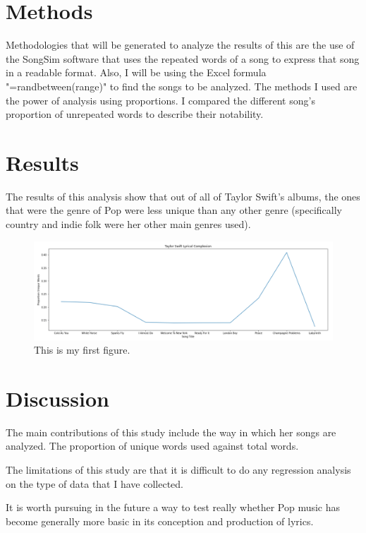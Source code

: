 \documentclass[12pt]{article}
\begin{document}
\section{Methods}
\label{sec:meth}

Methodologies that will be generated to analyze the results of this are the use of the SongSim software that uses the repeated words of a song to express that song in a readable format. Also, I will be using the Excel formula "=randbetween(range)" to find the songs to be analyzed. The methods I used are the power of analysis using proportions. I compared the different song's proportion of unrepeated words to describe their notability. 


\section{Results}
\label{sec:resu}
The results of this analysis show that out of all of Taylor Swift's albums, the ones that were the genre of Pop were less unique than any other genre (specifically country and indie folk were her other main genres used). 



\begin{figure}[htbp]
  \centering
  \includegraphics[width=\textwidth]{graph.png}
  \caption{This is my first figure.}
  \label{fig:graph}
\end{figure}

\section{Discussion}
\label{sec:disc}

The main contributions of this study include the way in which her songs are analyzed. The proportion of unique words used against total words. 

The limitations of this study are that it is difficult to do any regression analysis on the type of data that I have collected. 

It is worth pursuing in the future a way to test really whether Pop music has become generally more basic in its conception and production of lyrics. 




\end{document}
